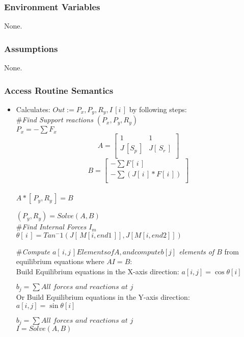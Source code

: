 \documentclass[12pt, titlepage]{article}
\begin{document}
\subsubsection{Environment Variables}
None.

\subsubsection{Assumptions}
None.
\subsubsection{Access Routine Semantics}
\begin{itemize}
    \item Calculates: $Out:=P_x,P_y,R_y,I\,[i\,]$ by following steps:\\
    \#\textit{Find Support reactions $(P_x,P_y,R_y)$}\\
$P_x=-\sum F_x$\\
\[A=
   \left[ {\begin{array}{cc}
    1 & 1 \\
    J\,[S_p\,] & J[\,S_r\,] \\
  \end{array} } \right]\]
\[B=
   \left[ {\begin{array}{cc}
    -\sum F[\,i\,] \\
    -\sum (J[\,i\,]* F[\,i\,])  \\
  \end{array} } \right]
\]\\ 
$A*[\,P_y,R_y\,] =B$

$(P_y,R_y) = Solve(A,B)$\\

\#\textit{Find Internal Forces $I_m$}\\

$\theta[\,i\,]=Tan^-1(J[\,M[i,end1\,]],J[M[i,end2]])$

\#\textit{Compute $a[\,i,j\,] Elements of A,and compute b[j]$ elements of $B$} from equilibrium equations where $AI=B$:\\

Build Equilibrium equations in the X-axis direction:
$a[i,j]=\cos\theta[i]$

$b_j=\sum \textit{All forces and reactions at j}$\\

Or Build Equilibrium equations in the Y-axis direction:\\

$a[i,j]=\sin\theta[i]$

$b_j=\sum \textit{All forces and reactions at j}$\\

$I=Solve(A,B)$


    
    
\end{itemize}
\end{document}
